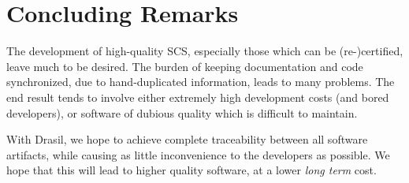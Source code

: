 \documentclass{sig-alternate-05-2015}
\newcommand{\lss}{Drasil}
\begin{document}
\section{Concluding Remarks} \label{sec:conclusion}

The development of high-quality SCS, especially those which can be
(re-)certified, leave much to be desired.  The burden of keeping documentation
and code synchronized, due to hand-duplicated information, leads to many 
problems.  The end result tends to involve either extremely high development
costs (and bored developers), or software of dubious quality which is 
difficult to maintain.

With \lss{}, we hope to achieve complete traceability between all software
artifacts, while causing as little inconvenience to the developers as possible.
We hope that this will lead to higher quality software, at a lower
\emph{long term} cost.


  
\end{document}
